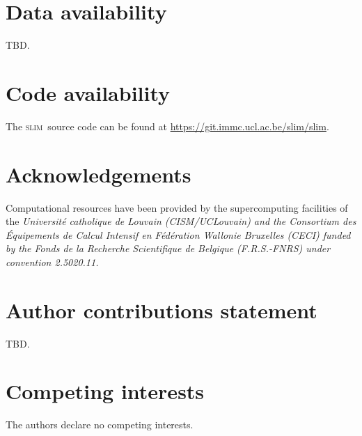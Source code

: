 \documentclass[fleqn,10pt]{wlscirep}
\newcommand{\slim}{\textsc{slim}\ }
\begin{document}
\lipsum[1-1]


\section*{Data availability}

TBD.

\section*{Code availability}

The \slim source code can be found at \href{https://git.immc.ucl.ac.be/slim/slim}{https://git.immc.ucl.ac.be/slim/slim}.


\section*{Acknowledgements}

Computational resources have been provided by the supercomputing facilities of the \it{Universit\'e catholique de Louvain} (CISM/UCLouvain) and the \it{Consortium des \'Equipements de Calcul Intensif en F\'ed\'eration Wallonie Bruxelles} (CECI) funded by the \it{Fonds de la Recherche Scientifique de Belgique} (F.R.S.-FNRS) under convention 2.5020.11.

\section*{Author contributions statement}
TBD. 

\section*{Competing interests}
The authors declare no competing interests.



\end{document}
